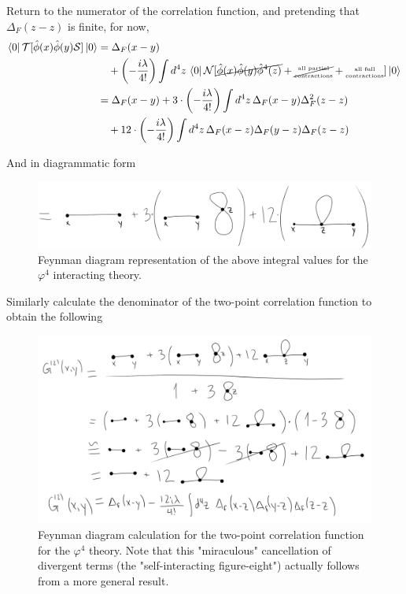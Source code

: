 \noindent Return to the numerator of the correlation function, and pretending that $\Delta_F(z-z)$ is finite, for now,
\begin{align*}
\bra{0} \mathcal{T} [\hat{\phi}(x) \hat{\phi}(y) \mathcal{S}]\ket{0} &= \Delta_F(x-y) \\
&\,\,\,\,\,\, + \left(-\frac{i\lambda}{4!}\right) \int d^4 z \, \bra{0} \mathcal{N} [\cancel{\hat{\phi}(x) \hat{\phi}(y) \hat{\phi}^4(z)} + \cancel{\text{\tiny {\stackanchor{all partial}{contractions}}}} + \text{\tiny {\stackanchor{all full}{contractions}}}] \ket{0} \\
&= \Delta_F(x-y) + 3 \cdot \left(-\frac{i\lambda}{4!}\right)\int d^4 z \, \Delta_F(x-y) \Delta_F^2(z-z) \\
&\,\,\,\,\,\, + 12 \cdot \left(-\frac{i\lambda}{4!}\right)\int d^4 z \, \Delta_F(x-z) \Delta_F(y-z) \Delta_F(z-z)
\end{align*}

\noindent And in diagrammatic form

\begin{figure}[H]
	\centering
	\includegraphics[scale=0.3]{images/feynman2.png}
	\caption{Feynman diagram representation of the above integral values for the $\varphi^4$ interacting theory.}
\end{figure}

\noindent Similarly calculate the denominator of the two-point correlation function to obtain the following

\begin{figure}[H]
	\centering
	\includegraphics[scale=0.4]{images/twopoint.png}
	\caption{Feynman diagram calculation for the two-point correlation function for the $\varphi^4$ theory. Note that this "miraculous" cancellation of divergent terms (the "self-interacting figure-eight") actually follows from a more general result.}
\end{figure}

